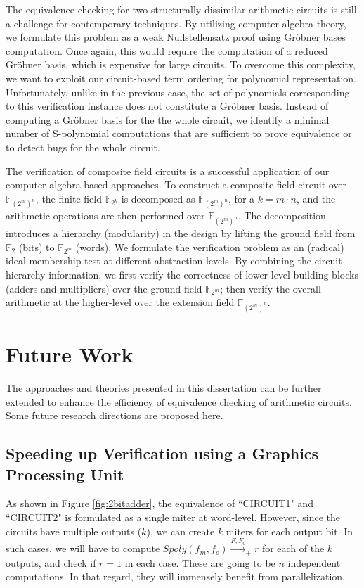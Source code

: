 {{The equivalence checking for two structurally dissimilar arithmetic circuits is still a challenge for contemporary techniques.
By utilizing computer algebra theory, we formulate this problem as a weak Nullstellensatz proof using Gr\"obner bases computation. 
Once again, this would require the computation of a reduced Gr\"obner basis, which is expensive for large circuits. 
To overcome this complexity, we want to exploit our circuit-based term ordering for polynomial representation. 
Unfortunately, unlike in the previous case, the set of polynomials corresponding to this verification instance does 
not constitute a Gr\"obner basis. Instead of computing a Gr\"obner basis for the the whole circuit, 
we identify a minimal number of S-polynomial computations that are sufficient to prove equivalence or 
to detect bugs for the whole circuit.

The verification of composite field circuits is a successful application of our computer algebra based approaches.
To construct a composite field circuit over $\mathbb{F}_{(2^m)^n}$, the finite field $\mathbb{F}_{2^k}$ is 
decomposed as $\mathbb{F}_{(2^m)^n}$, for a $k = m\cdot n$, 
and the arithmetic operations are then performed over $\mathbb{F}_{(2^m)^n}$. 
The decomposition introduces a hierarchy (modularity) in the design by lifting the ground field from $\mathbb{F}_2$
(bits) to $\mathbb{F}_{2^m}$ (words).
We formulate the verification problem as an (radical) ideal membership test at different abstraction levels.
By combining the circuit hierarchy information,  
we first verify the correctness of lower-level building-blocks (adders and 	multipliers) over the ground field $\mathbb{F}_{2^m}$; 
then verify the overall arithmetic at the higher-level over the extension field $\mathbb{F}_{(2^m)^n}$. 		

\section{Future Work}
The approaches and theories presented in this dissertation can be further extended to enhance 
the efficiency of equivalence checking of arithmetic circuits. Some future research directions are proposed here.


\subsection{Speeding up Verification using a Graphics Processing Unit}
As shown in Figure \ref{fig:2bitadder}, the equivalence of ``CIRCUIT1" and ``CIRCUIT2" 
is formulated as a single miter at word-level. However, since the circuits have multiple outputs ($k$),
we can create $k$ miters for each output bit.
In such cases, we will have to compute $Spoly(f_m,f_o) \stackrel{F,F_0}{\longrightarrow}_+ r$ 
for each of the $k$ outputs, and check if $r = 1$ in each case. 
These are going to be $n$ independent computations.
In that regard, they will immensely benefit from parallelization. 

}}

